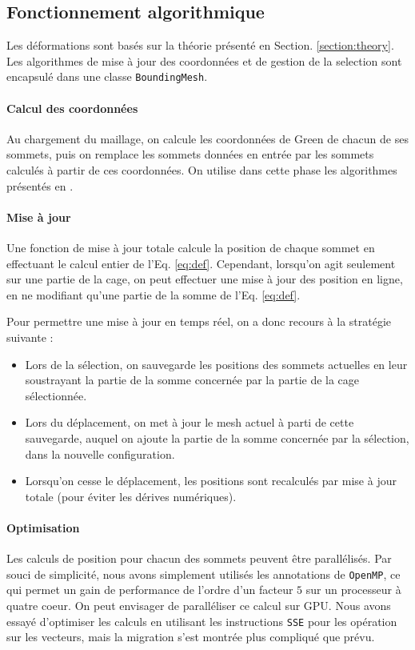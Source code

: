 \documentclass[10pt,a4paper]{article}
\begin{document}
\subsection{Fonctionnement algorithmique}

Les déformations sont basés sur la théorie présenté en Section. \ref{section:theory}. Les algorithmes de mise à jour des coordonnées et de gestion de la selection sont encapsulé dans une classe \texttt{BoundingMesh}.

\paragraph{Calcul des coordonnées}Au chargement du maillage, on calcule les coordonnées de Green de chacun de ses sommets, puis on remplace les sommets données en entrée par les sommets calculés à partir de ces coordonnées. On utilise dans cette phase les algorithmes présentés en \cite{lipman2008green}.

\paragraph{Mise à jour}Une fonction de mise à jour totale calcule la position de chaque sommet en effectuant le calcul entier de l'Eq. \ref{eq:def}. Cependant, lorsqu'on agit seulement sur une partie de la cage, on peut effectuer une mise à jour des position en ligne, en ne modifiant qu'une partie de la somme de l'Eq. \ref{eq:def}.

Pour permettre une mise à jour en temps réel, on a donc recours à la stratégie suivante :
\begin{itemize}
\item Lors de la sélection, on sauvegarde les positions des sommets actuelles en leur soustrayant la partie de la somme concernée par la partie de la cage sélectionnée.
\item Lors du déplacement, on met à jour le mesh actuel à parti de cette sauvegarde, auquel on ajoute la partie de la somme concernée par la sélection, dans la nouvelle configuration.
\item Lorsqu'on cesse le déplacement, les positions sont recalculés par mise à jour totale (pour éviter les dérives numériques).
\end{itemize}

\paragraph{Optimisation}Les calculs de position pour chacun des sommets peuvent être parallélisés. Par souci de simplicité, nous avons simplement utilisés les annotations de \texttt{OpenMP}, ce qui permet un gain de performance de l'ordre d'un facteur $5$ sur un processeur à quatre coeur. On peut envisager de paralléliser ce calcul sur GPU. Nous avons essayé d'optimiser les calculs en utilisant les instructions \texttt{SSE} pour les opération sur les vecteurs, mais la migration s'est montrée plus compliqué que prévu.
\end{document}
